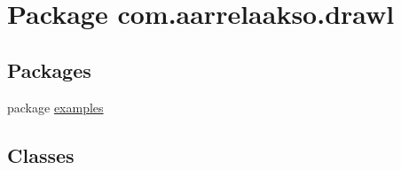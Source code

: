 \hypertarget{namespacecom_1_1aarrelaakso_1_1drawl}{}\section{Package com.\+aarrelaakso.\+drawl}
\label{namespacecom_1_1aarrelaakso_1_1drawl}
\subsection*{Packages}
\begin{DoxyCompactItemize}
\item 
package \hyperlink{namespacecom_1_1aarrelaakso_1_1drawl_1_1examples}{examples}
\end{DoxyCompactItemize}
\subsection*{Classes}
